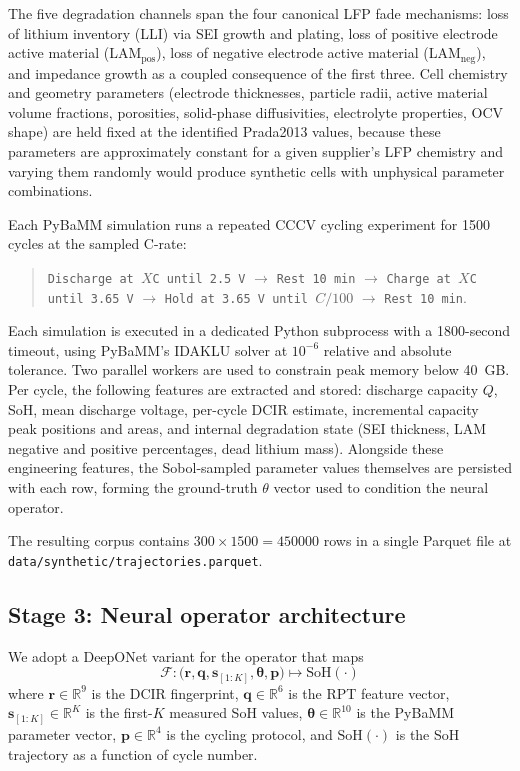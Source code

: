 \documentclass[preprint,12pt,3p,authoryear]{elsarticle}
\begin{document}
The five degradation channels span the four canonical LFP fade
mechanisms: loss of lithium inventory (LLI) via SEI growth and plating,
loss of positive electrode active material (LAM\(_\text{pos}\)), loss of
negative electrode active material (LAM\(_\text{neg}\)), and impedance
growth as a coupled consequence of the first three. Cell chemistry and
geometry parameters (electrode thicknesses, particle radii, active
material volume fractions, porosities, solid-phase diffusivities,
electrolyte properties, OCV shape) are held fixed at the identified
Prada2013 values, because these parameters are approximately constant
for a given supplier's LFP chemistry and varying them
randomly would produce synthetic cells with unphysical parameter
combinations.

Each PyBaMM simulation runs a repeated CCCV cycling experiment for
\num{1500} cycles at the sampled C-rate:
\begin{quote}
    \small
    \texttt{Discharge at \(X\)C until \SI{2.5}{\volt}} \(\to\)
    \texttt{Rest 10 min} \(\to\)
    \texttt{Charge at \(X\)C until \SI{3.65}{\volt}} \(\to\)
    \texttt{Hold at \SI{3.65}{\volt} until \(C/100\)} \(\to\)
    \texttt{Rest 10 min}.
\end{quote}
Each simulation is executed in a dedicated Python subprocess with a
\num{1800}-second timeout, using PyBaMM's IDAKLU solver at
\(10^{-6}\) relative and absolute tolerance. Two parallel workers are
used to constrain peak memory below \SI{40}{GB}. Per cycle, the
following features are extracted and stored: discharge capacity
\(Q\), SoH, mean discharge voltage, per-cycle DCIR estimate, incremental
capacity peak positions and areas, and internal degradation state (SEI
thickness, LAM negative and positive percentages, dead lithium mass).
Alongside these engineering features, the Sobol-sampled parameter values
themselves are persisted with each row, forming the ground-truth
\(\theta\) vector used to condition the neural operator.

The resulting corpus contains
\(300 \times 1500 = \num{450000}\) rows in a single Parquet file at
\texttt{data/synthetic/trajectories.parquet}.

\subsection{Stage 3: Neural operator architecture}
\label{sec:methods:operator}

We adopt a DeepONet variant \citep{lu2021learning} for the operator that
maps
\begin{equation}
    \mathcal{F}: \bigl(\mathbf{r}, \mathbf{q}, \mathbf{s}_{[1:K]},
    \boldsymbol{\theta}, \mathbf{p}\bigr) \mapsto
    \text{SoH}(\cdot)
\end{equation}
where \(\mathbf{r} \in \mathbb{R}^9\) is the DCIR fingerprint,
\(\mathbf{q} \in \mathbb{R}^6\) is the RPT feature vector,
\(\mathbf{s}_{[1:K]} \in \mathbb{R}^K\) is the first-\(K\)
measured SoH values, \(\boldsymbol{\theta} \in \mathbb{R}^{10}\) is
the PyBaMM parameter vector, \(\mathbf{p} \in \mathbb{R}^4\) is the
cycling protocol, and \(\text{SoH}(\cdot)\) is the SoH trajectory as a
function of cycle number.
\end{document}
